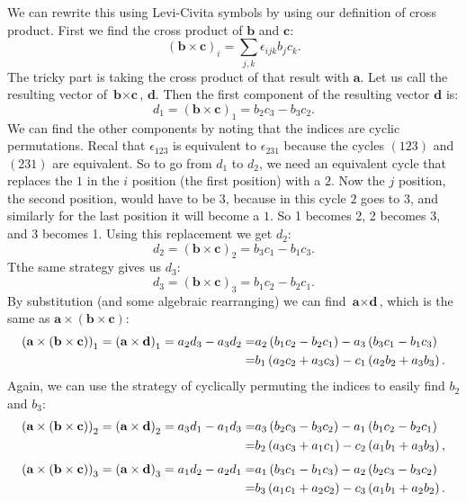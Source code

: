 We can rewrite this using Levi-Civita symbols by using our definition of cross product.  First we find the cross product of $\textbf{b}$ and $\textbf{c}$:
\[ (\textbf{b} \times \textbf{c})_i = \sum_{j,k} \epsilon_{ijk} b_j c_k. \]
The tricky part is taking the cross product of that result with $\textbf{a}$.  Let us call the resulting vector of $\textbf{b} \times \textbf{c}$, $\textbf{d}$.  Then the first component of the resulting vector $\textbf{d}$ is:
\[d_1 = \left(\textbf{b} \times \textbf{c} \right)_1 = b_2 c_3 - b_3 c_2. \]
We can find the other components by noting that the indices are cyclic permutations.  Recal that $\epsilon_{123}$ is equivalent to $\epsilon_{231}$ because the cycles $(123)$ and $(231)$ are equivalent.  So to go from $d_1$ to $d_2$, we need an equivalent cycle that replaces the $1$ in the $i$ position (the first position) with a $2$.  Now the $j$ position, the second position, would have to be $3$, because in this cycle $2$ goes to $3$, and similarly for the last position it will become a $1$.  So 1 becomes 2, 2 becomes 3, and 3 becomes 1.  Using this replacement we get $d_2$:
\[d_2 = \left(\textbf{b} \times \textbf{c} \right)_2 = b_3 c_1 - b_1 c_3. \]
Tthe same strategy gives us $d_3$:
\[d_3 = \left(\textbf{b} \times \textbf{c} \right)_3 = b_1 c_2 - b_2 c_1. \]
By substitution (and some algebraic rearranging) we can find $\textbf{a} \times \textbf{d}$, which is the same as $\textbf{a} \times \left(\textbf{b} \times \textbf{c}\right)$:
\begin{align}
 \left(\textbf{a} \times (\textbf{b} \times \textbf{c}) \right)_1 =  \left(\textbf{a} \times \textbf{d} \right)_1 =  a_2 d_3 - a_3 d_2 =& a_2 \left(b_1 c_2 - b_2 c_1 \right) - a_3 \left(b_3 c_1 - b_1 c_3 \right) \notag\\
=& b_1 \left(a_2 c_2 + a_3 c_3\right) - c_1 \left(a_2 b_2 + a_3 b_3 \right). \notag
\end{align}
Again, we can use the strategy of cyclically permuting the indices to easily find $b_2$ and $b_3$:
\begin{align}
 \left(\textbf{a} \times (\textbf{b} \times \textbf{c}) \right)_2 =  \left(\textbf{a} \times \textbf{d} \right)_2 =  a_3 d_1 - a_1 d_3 =& a_3 \left(b_2 c_3 - b_3 c_2 \right) - a_1 \left(b_1 c_2 - b_2 c_1 \right) \notag\\
=& b_2 \left(a_3 c_3 + a_1 c_1\right) - c_2 \left(a_1 b_1 + a_3 b_3 \right), \notag
\end{align}
\begin{align}
 \left(\textbf{a} \times (\textbf{b} \times \textbf{c}) \right)_3 =  \left(\textbf{a} \times \textbf{d} \right)_3 =  a_1 d_2 - a_2 d_1 =& a_1 \left(b_3 c_1 - b_1 c_3 \right) - a_2 \left(b_2 c_3 - b_3 c_2 \right) \notag\\
=& b_3 \left(a_1 c_1 + a_2 c_2\right) - c_3 \left(a_1 b_1 + a_2 b_2 \right). \notag
\end{align}
